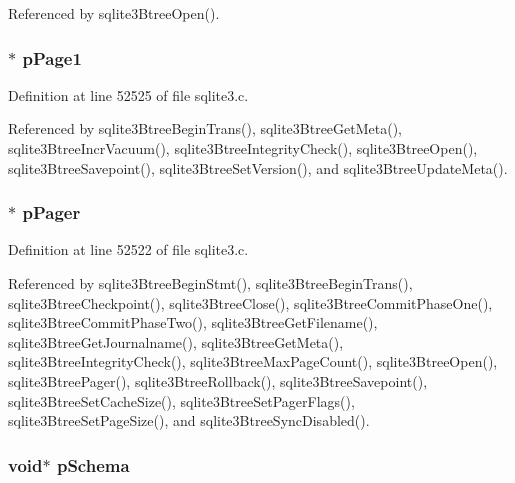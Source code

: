 Referenced by sqlite3\+Btree\+Open().

\hypertarget{struct_bt_shared_a7bec85d9a111476136787bc98741ef3c}{}
\subsubsection[{p\+Page1}]{$\ast$ p\+Page1}\label{struct_bt_shared_a7bec85d9a111476136787bc98741ef3c}


Definition at line 52525 of file sqlite3.\+c.



Referenced by sqlite3\+Btree\+Begin\+Trans(), sqlite3\+Btree\+Get\+Meta(), sqlite3\+Btree\+Incr\+Vacuum(), sqlite3\+Btree\+Integrity\+Check(), sqlite3\+Btree\+Open(), sqlite3\+Btree\+Savepoint(), sqlite3\+Btree\+Set\+Version(), and sqlite3\+Btree\+Update\+Meta().

\hypertarget{struct_bt_shared_a916447fa61ba4e11cc93d571a66d3aaf}{}
\subsubsection[{p\+Pager}]{$\ast$ p\+Pager}\label{struct_bt_shared_a916447fa61ba4e11cc93d571a66d3aaf}


Definition at line 52522 of file sqlite3.\+c.



Referenced by sqlite3\+Btree\+Begin\+Stmt(), sqlite3\+Btree\+Begin\+Trans(), sqlite3\+Btree\+Checkpoint(), sqlite3\+Btree\+Close(), sqlite3\+Btree\+Commit\+Phase\+One(), sqlite3\+Btree\+Commit\+Phase\+Two(), sqlite3\+Btree\+Get\+Filename(), sqlite3\+Btree\+Get\+Journalname(), sqlite3\+Btree\+Get\+Meta(), sqlite3\+Btree\+Integrity\+Check(), sqlite3\+Btree\+Max\+Page\+Count(), sqlite3\+Btree\+Open(), sqlite3\+Btree\+Pager(), sqlite3\+Btree\+Rollback(), sqlite3\+Btree\+Savepoint(), sqlite3\+Btree\+Set\+Cache\+Size(), sqlite3\+Btree\+Set\+Pager\+Flags(), sqlite3\+Btree\+Set\+Page\+Size(), and sqlite3\+Btree\+Sync\+Disabled().

\hypertarget{struct_bt_shared_a9196b055b4bfcce3685531186d868627}{}
\subsubsection[{p\+Schema}]{\setlength{\rightskip}{0pt plus 5cm}void$\ast$ p\+Schema}\label{struct_bt_shared_a9196b055b4bfcce3685531186d868627}


